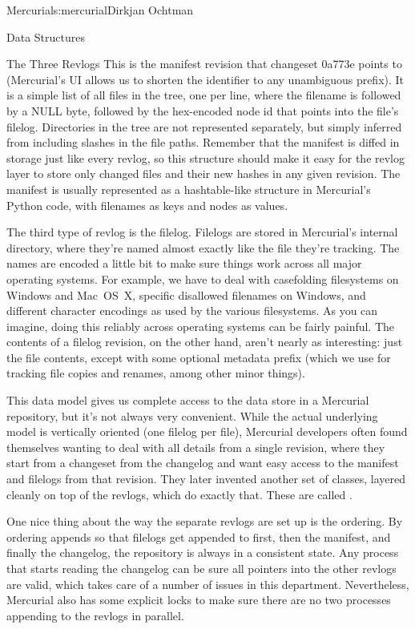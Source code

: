 \begin{aosachapter}{Mercurial}{s:mercurial}{Dirkjan Ochtman}
\begin{aosasect1}{Data Structures}
\begin{aosasect2}{The Three Revlogs}
\noindent This is the manifest revision that changeset 0a773e points to
(Mercurial's UI allows us to shorten the identifier to any unambiguous
prefix). It is a simple list of all files in the tree, one per line,
where the filename is followed by a NULL byte, followed by the
hex-encoded node id that points into the file's filelog. Directories
in the tree are not represented separately, but simply inferred from
including slashes in the file paths. Remember that the manifest is
diffed in storage just like every revlog, so this structure should
make it easy for the revlog layer to store only changed files and
their new hashes in any given revision. The manifest is usually
represented as a hashtable-like structure in Mercurial's Python code,
with filenames as keys and nodes as values.

The third type of revlog is the filelog. Filelogs are stored in Mercurial's internal  directory,
where they're named almost exactly like the file they're tracking. The
names are encoded a little bit to make sure things work across all
major operating systems. For example, we have to deal with casefolding
filesystems on Windows and Mac~OS~X, specific disallowed filenames on
Windows, and different character encodings as used by the various
filesystems. As you can imagine, doing this reliably across operating
systems can be fairly painful. The contents of a filelog revision, on
the other hand, aren't nearly as interesting: just the file contents,
except with some optional metadata prefix (which we use for tracking
file copies and renames, among other minor things).

This data model gives us complete access to the data store in a
Mercurial repository, but it's not always very convenient. While the
actual underlying model is vertically oriented (one filelog per file),
Mercurial developers often found themselves wanting to deal with all
details from a single revision, where they start from a changeset from
the changelog and want easy access to the manifest and filelogs from
that revision.  They later invented another set of classes, layered
cleanly on top of the revlogs, which do exactly that. These are
called .

One nice thing about the way the separate revlogs are set up is the
ordering. By ordering appends so that filelogs get appended to first,
then the manifest, and finally the changelog, the repository is always
in a consistent state. Any process that starts reading the changelog
can be sure all pointers into the other revlogs are valid, which takes
care of a number of issues in this department. Nevertheless, Mercurial
also has some explicit locks to make sure there are no two processes
appending to the revlogs in parallel.


\end{aosasect2}
\end{aosasect1}
\end{aosachapter}
